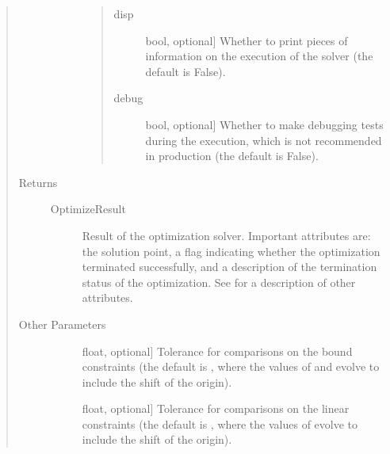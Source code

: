 \documentclass[letterpaper,10pt,english]{sphinxmanual}
\begin{document}
\begin{fulllineitems}
\begin{quote}
\begin{description}
\begin{description}
\begin{quote}
\begin{description}
\item[{disp}] \leavevmode{[}bool, optional{]}
\sphinxAtStartPar
Whether to print pieces of information on the execution of the
solver (the default is False).

\item[{debug}] \leavevmode{[}bool, optional{]}
\sphinxAtStartPar
Whether to make debugging tests during the execution, which is
not recommended in production (the default is False).

\end{description}
\end{quote}

\end{description}

\item[{Returns}] \leavevmode\begin{description}
\item[{OptimizeResult}] \leavevmode
\sphinxAtStartPar
Result of the optimization solver. Important attributes are:  the
solution point,  a flag indicating whether the optimization
terminated successfully, and  a description of the
termination status of the optimization. See {\hyperref[\detokenize{refs/generated/cobyqa.OptimizeResult:cobyqa.OptimizeResult}]{}} for a
description of other attributes.

\end{description}

\item[{Other Parameters}] \leavevmode\begin{description}
\item[{}] \leavevmode{[}float, optional{]}
\sphinxAtStartPar
Tolerance for comparisons on the bound constraints (the default is
, where the values
of  and  evolve to include the shift of the origin).

\item[{}] \leavevmode{[}float, optional{]}
\sphinxAtStartPar
Tolerance for comparisons on the linear constraints (the default is
, where the values
of  evolve to include the shift of the origin).


\end{description}
\end{description}
\end{quote}
\end{fulllineitems}
\end{document}
